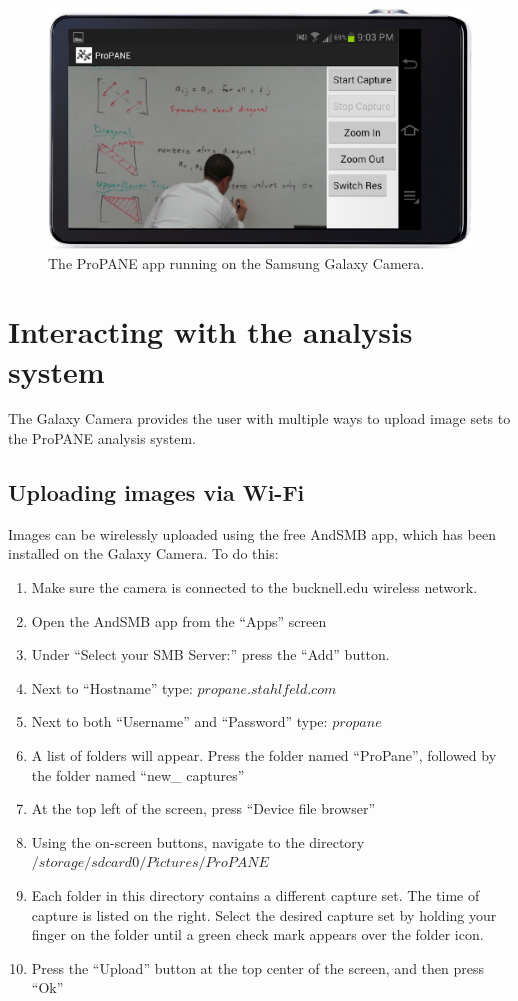 \documentclass[]{article}
\begin{document}
\begin{figure}[h]
\centering
\includegraphics[scale=0.15]{images/app}
\caption{The ProPANE app running on the Samsung Galaxy Camera.}
\end{figure}
		\section{Interacting with the analysis system}
		The Galaxy Camera provides the user with multiple ways to upload image sets to the ProPANE analysis system.  
		\subsection{Uploading images via Wi-Fi}
		Images can be wirelessly uploaded using the free AndSMB app, which has been installed on the Galaxy Camera. To do this:
	
		\begin{enumerate}
		\item{Make sure the camera is connected to the bucknell.edu wireless network.}
		\item{Open the AndSMB app from the ``Apps'' screen}
		\item{Under ``Select your SMB Server:'' press the ``Add'' button.}
		\item{Next to ``Hostname'' type: $propane.stahlfeld.com$}
		\item{Next to both ``Username'' and ``Password'' type: $propane$}
		\item{A list of folders will appear.  Press the folder named ``ProPane'', followed by the folder named ``new\_ captures''}
		\item{At the top left of the screen, press ``Device file browser''}
		\item{Using the on-screen buttons, navigate to the directory $/storage/sdcard0/Pictures/ProPANE$}
		\item{Each folder in this directory contains a different capture set.  The time of capture is listed on the right.  Select the desired capture set by holding your finger on the folder until a green check mark appears over the folder icon.}
		\item{Press the ``Upload'' button at the top center of the screen, and then press ``Ok''}
		\end{enumerate}
\end{document}
